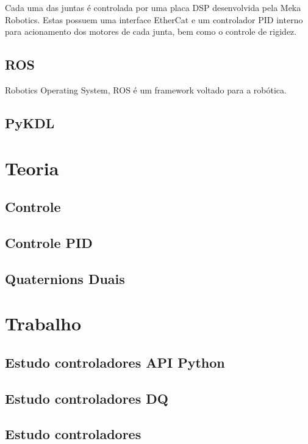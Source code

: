 Cada uma das juntas é controlada por uma placa DSP desenvolvida pela Meka Robotics. Estas possuem uma interface EtherCat e um controlador PID interno para acionamento dos motores de cada junta, bem como o controle de rigidez.

\subsection{ROS}

Robotics Operating System, ROS é um framework voltado para a robótica. 

\subsection{PyKDL}

\section{Teoria}

\subsection{Controle}

\subsection{Controle PID}

\subsection{Quaternions Duais}

\section{Trabalho}

\subsection{Estudo controladores API Python}

\subsection{Estudo controladores DQ}

\subsection{Estudo controladores}

